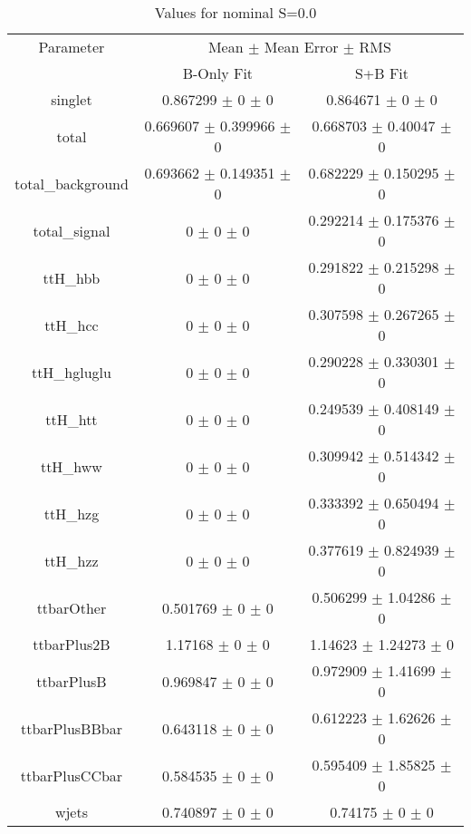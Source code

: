 \begin{table}
\centering
\caption{Values for nominal S=0.0}
\begin{tabular}{ccc}
\toprule
Parameter & \multicolumn{2}{c}{Mean $\pm$ Mean Error $\pm$ RMS}\\
 & B-Only Fit & S+B Fit\\
\midrule
singlet & \num{0.867299} $\pm$ \num{0} $\pm$ \num{0} & \num{0.864671} $\pm$ \num{0} $\pm$ \num{0}\\
total & \num{0.669607} $\pm$ \num{0.399966} $\pm$ \num{0} & \num{0.668703} $\pm$ \num{0.40047} $\pm$ \num{0}\\
total\_background & \num{0.693662} $\pm$ \num{0.149351} $\pm$ \num{0} & \num{0.682229} $\pm$ \num{0.150295} $\pm$ \num{0}\\
total\_signal & \num{0} $\pm$ \num{0} $\pm$ \num{0} & \num{0.292214} $\pm$ \num{0.175376} $\pm$ \num{0}\\
ttH\_hbb & \num{0} $\pm$ \num{0} $\pm$ \num{0} & \num{0.291822} $\pm$ \num{0.215298} $\pm$ \num{0}\\
ttH\_hcc & \num{0} $\pm$ \num{0} $\pm$ \num{0} & \num{0.307598} $\pm$ \num{0.267265} $\pm$ \num{0}\\
ttH\_hgluglu & \num{0} $\pm$ \num{0} $\pm$ \num{0} & \num{0.290228} $\pm$ \num{0.330301} $\pm$ \num{0}\\
ttH\_htt & \num{0} $\pm$ \num{0} $\pm$ \num{0} & \num{0.249539} $\pm$ \num{0.408149} $\pm$ \num{0}\\
ttH\_hww & \num{0} $\pm$ \num{0} $\pm$ \num{0} & \num{0.309942} $\pm$ \num{0.514342} $\pm$ \num{0}\\
ttH\_hzg & \num{0} $\pm$ \num{0} $\pm$ \num{0} & \num{0.333392} $\pm$ \num{0.650494} $\pm$ \num{0}\\
ttH\_hzz & \num{0} $\pm$ \num{0} $\pm$ \num{0} & \num{0.377619} $\pm$ \num{0.824939} $\pm$ \num{0}\\
ttbarOther & \num{0.501769} $\pm$ \num{0} $\pm$ \num{0} & \num{0.506299} $\pm$ \num{1.04286} $\pm$ \num{0}\\
ttbarPlus2B & \num{1.17168} $\pm$ \num{0} $\pm$ \num{0} & \num{1.14623} $\pm$ \num{1.24273} $\pm$ \num{0}\\
ttbarPlusB & \num{0.969847} $\pm$ \num{0} $\pm$ \num{0} & \num{0.972909} $\pm$ \num{1.41699} $\pm$ \num{0}\\
ttbarPlusBBbar & \num{0.643118} $\pm$ \num{0} $\pm$ \num{0} & \num{0.612223} $\pm$ \num{1.62626} $\pm$ \num{0}\\
ttbarPlusCCbar & \num{0.584535} $\pm$ \num{0} $\pm$ \num{0} & \num{0.595409} $\pm$ \num{1.85825} $\pm$ \num{0}\\
wjets & \num{0.740897} $\pm$ \num{0} $\pm$ \num{0} & \num{0.74175} $\pm$ \num{0} $\pm$ \num{0}\\
\bottomrule
\end{tabular}
\end{table}